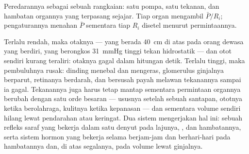 \begin{omfigure}

{\small Peredarannya sebagai sebuah rangkaian: satu pompa, satu
tekanan, dan hambatan  organnya yang terpasang sejajar. Tiap
organ mengambil $\bar P/R_i$; pengaturannya menahan $\bar P$ sementara
tiap $R_i$ disetel menurut permintaannya.}
\end{omfigure}

\begin{proposition}\label{prop:b2:blood-pressure:why}
Terlalu rendah, maka otaknya --- yang berada \qty{40}{cm} di atas
 pada orang dewasa yang berdiri, yang berongkos
\qty{31}{mmHg} tinggi tekan hidrostatik --- dan otot 
sendiri kurang teraliri: otaknya gagal dalam hitungan detik. Terlalu
tinggi, maka pembuluhnya rusak: dinding  menebal dan
mengeras, glomerulus ginjalnya berparut, retinanya berdarah, dan
 bersusah payah melawan tekanannya sampai ia gagal.
Tekanannya juga harus tetap mantap sementara permintaan organnya
berubah dengan satu orde besaran --- ususnya setelah sebuah santapan,
ototnya ketika berolahraga, kulitnya ketika kepanasan --- dan
sementara volume  sendiri hilang lewat pendarahan atau
keringat. Dua sistem mengerjakan hal ini: sebuah refleks saraf yang
bekerja dalam satu denyut pada lajunya, , dan
hambatannya, serta sistem hormon yang bekerja selama berjam-jam dan
berhari-hari pada hambatannya dan, di atas segalanya, pada volume
 lewat ginjalnya.
\end{proposition}

